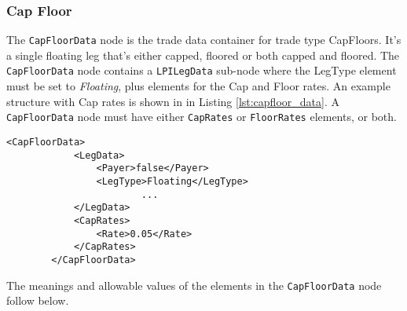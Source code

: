 

\subsubsection{Cap Floor}

The \lstinline!CapFloorData! node is the trade data container for trade type CapFloors.  It's a single floating leg that's either capped, floored or both capped and floored. The \lstinline!CapFloorData! node contains a \lstinline!LPILegData!  sub-node where the LegType element must be set to  \emph{Floating}, plus elements for the Cap and Floor rates. An example structure with Cap rates is shown in  in Listing \ref{lst:capfloor_data}. A \lstinline!CapFloorData! node must have either \lstinline!CapRates! or \lstinline!FloorRates! elements, or both. 



\begin{lstlisting}[caption=CapFloorData, label=lst:capfloor_data]
        <CapFloorData>
            <LegData>
                <Payer>false</Payer>
                <LegType>Floating</LegType>
                		...
            </LegData>
            <CapRates>
                <Rate>0.05</Rate>
            </CapRates>
        </CapFloorData>
\end{lstlisting}

The meanings and allowable values of the elements in the \lstinline!CapFloorData!  node follow below.

